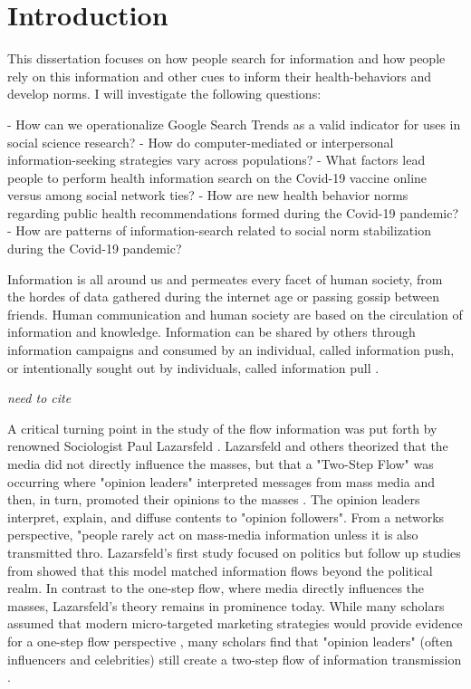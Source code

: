 \hypertarget{intro}{%
\chapter{Introduction}\label{intro}}


This dissertation focuses on how people search for information and how
people rely on this information and other cues to inform their
health-behaviors and develop norms. I will investigate the following
questions: 

- How can we operationalize Google Search Trends as a valid indicator for uses in social science research?    
- How do computer-mediated or interpersonal information-seeking strategies vary
across populations?
- What factors lead people to perform health information search on the Covid-19 vaccine online versus among social network ties? 
- How are new health behavior norms regarding public health recommendations formed during the Covid-19 pandemic?  
- How are patterns of information-search related to social norm stabilization during the Covid-19 pandemic?  

Information is all around us and permeates every facet of human society,
from the hordes of data gathered during the internet age or passing
gossip between friends. Human communication and human society are based
on the circulation of information and knowledge. Information can be
shared by others through information campaigns and consumed by an
individual, called information push, or intentionally sought out by
individuals, called information pull \citep{cybenkoFoundationsInformationPush1999}.

\emph{need to cite \citep{bayer_etal20, bossetta18}}

A critical turning point in the study of the flow information was put forth by renowned Sociologist Paul Lazarsfeld \citeyearpar{lazarsfeldPeopleChoice1944}. Lazarsfeld and others theorized that the media did not directly influence the masses, but that a "Two-Step Flow" was occurring where "opinion leaders" interpreted messages from mass media and then, in turn, promoted their opinions to the masses \citep{katzPersonalInfluencePart1955}. The opinion leaders interpret, explain, and diffuse contents to "opinion followers". From a networks
perspective, "people rarely act on mass-media information unless it is also transmitted thro\citep[p. 1374]{granovetterStrengthWeakTies1973}. Lazarsfeld's first study focused on politics \citeyearpar{lazarsfeldPeopleChoice1944} but follow up studies from \citep{katzPersonalInfluencePart1955} showed that this model matched information flows beyond the political realm. In contrast to the one-step flow, where media directly influences the masses, Lazarsfeld's theory remains in prominence today. While many scholars assumed that
modern micro-targeted marketing strategies would provide evidence for a one-step flow perspective \citep{bennettOneStepFlowCommunication2006}, many scholars find that "opinion leaders" (often influencers and celebrities) still create a two-step flow of information transmission \citep{choi15, hilbertOneStepTwo2017}.

